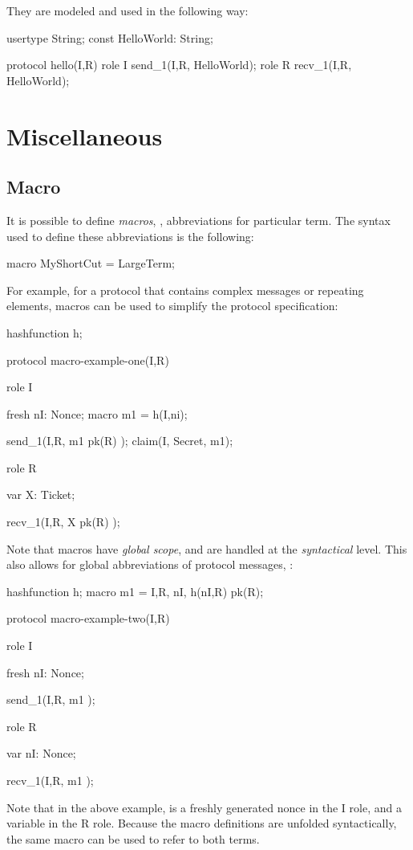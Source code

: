 \documentclass{book}
\begin{document}
They are modeled and used in the following way:
\begin{spdl}
usertype String;
const HelloWorld: String;

protocol hello(I,R)
{
  role I {
    send_1(I,R, HelloWorld);
  }
  role R {
    recv_1(I,R, HelloWorld);
  }
}
\end{spdl}


\section{Miscellaneous}

\subsection[Macro]{Macro}
It is possible to define \emph{macros}, \ie, abbreviations for
particular term. 
The syntax used to define these abbreviations is the following:
\begin{spdl}
  macro MyShortCut = LargeTerm;
\end{spdl}
For example, for a protocol that contains complex
messages or repeating elements, macros can be used to simplify the
protocol specification:
\begin{spdl}
hashfunction h;

protocol macro-example-one(I,R) {
   role I {
      fresh nI: Nonce;
      macro m1 = h(I,ni);

      send_1(I,R, { m1 }pk(R) );
      claim(I, Secret, m1);
   }
   role R {
      var X: Ticket;

      recv_1(I,R, { X }pk(R) );
   }
}
\end{spdl}
Note that macros have \emph{global scope}, and are handled at the 
\emph{syntactical} level. This also allows for global abbreviations of
protocol messages, \eg:
\begin{spdl}
hashfunction h;
macro m1 = { I,R, nI, h(nI,R) }pk(R);

protocol macro-example-two(I,R) {
   role I {
      fresh nI: Nonce;

      send_1(I,R, m1 );
   }
   role R {
      var nI: Nonce;

      recv_1(I,R, m1 );
   }
}
\end{spdl}
Note that in the above example,  is a freshly generated nonce in
the I role, and a variable in the R role. Because the macro definitions
are unfolded syntactically, the same macro can be used to refer to both
terms.
\end{document}
